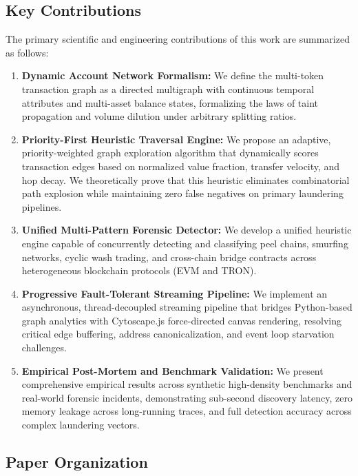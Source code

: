 \subsection{Key Contributions}

The primary scientific and engineering contributions of this work are summarized as follows:

\begin{enumerate}
    \item \textbf{Dynamic Account Network Formalism:} We define the multi-token transaction graph as a directed multigraph with continuous temporal attributes and multi-asset balance states, formalizing the laws of taint propagation and volume dilution under arbitrary splitting ratios.
    \item \textbf{Priority-First Heuristic Traversal Engine:} We propose an adaptive, priority-weighted graph exploration algorithm that dynamically scores transaction edges based on normalized value fraction, transfer velocity, and hop decay. We theoretically prove that this heuristic eliminates combinatorial path explosion while maintaining zero false negatives on primary laundering pipelines.
    \item \textbf{Unified Multi-Pattern Forensic Detector:} We develop a unified heuristic engine capable of concurrently detecting and classifying peel chains, smurfing networks, cyclic wash trading, and cross-chain bridge contracts across heterogeneous blockchain protocols (EVM and TRON).
    \item \textbf{Progressive Fault-Tolerant Streaming Pipeline:} We implement an asynchronous, thread-decoupled streaming pipeline that bridges Python-based graph analytics with Cytoscape.js force-directed canvas rendering, resolving critical edge buffering, address canonicalization, and event loop starvation challenges.
    \item \textbf{Empirical Post-Mortem and Benchmark Validation:} We present comprehensive empirical results across synthetic high-density benchmarks and real-world forensic incidents, demonstrating sub-second discovery latency, zero memory leakage across long-running traces, and full detection accuracy across complex laundering vectors.
\end{enumerate}

\subsection{Paper Organization}

